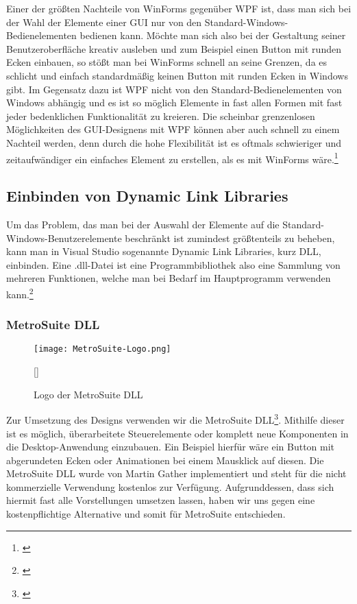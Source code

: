 Einer der größten Nachteile von WinForms gegenüber WPF ist, dass man sich bei der Wahl der Elemente einer GUI nur von den Standard-Windows-Bedienelementen bedienen kann. Möchte man sich also bei der Gestaltung seiner Benutzeroberfläche kreativ ausleben und zum Beispiel einen Button mit runden Ecken einbauen, so stößt man bei WinForms schnell an seine Grenzen, da es schlicht und einfach standardmäßig keinen Button mit runden Ecken in Windows gibt. Im Gegensatz dazu ist WPF nicht von den Standard-Bedienelementen von Windows abhängig und es ist so möglich Elemente in fast allen Formen mit fast jeder bedenklichen Funktionalität zu kreieren. Die scheinbar grenzenlosen Möglichkeiten des GUI-Designens mit WPF können aber auch schnell zu einem Nachteil werden, denn durch die hohe Flexibilität ist es oftmals schwieriger und zeitaufwändiger ein einfaches Element zu erstellen, als es mit WinForms wäre.\footnote[3]{\cite[Vgl.][]{Vergleich}}

\subsection{Einbinden von Dynamic Link Libraries}

 Um das Problem, das man bei der Auswahl der Elemente auf die Standard-Windows-Benutzerelemente beschränkt ist zumindest größtenteils zu beheben, kann man in Visual Studio sogenannte Dynamic Link Libraries, kurz DLL, einbinden. Eine .dll-Datei ist eine Programmbibliothek also eine Sammlung von mehreren Funktionen, welche man bei Bedarf im Hauptprogramm verwenden kann.\footnote[1]{\cite[Vgl.][]{DLL}}

\subsubsection{MetroSuite DLL}

\begin{figure}[H]
    \centering
    \texttt{[image: MetroSuite-Logo.png]}
    \caption[MetroSuiteDLL-Logo]{Logo der MetroSuite DLL}[\cite{MetroSuite1}]
\end{figure}
\noindent 
Zur Umsetzung des Designs verwenden wir die MetroSuite DLL\footnote[2]{\cite[Vgl.][]{MetroSuite2}}. Mithilfe dieser ist es möglich, überarbeitete Steuerelemente oder komplett neue Komponenten in die Desktop-Anwendung einzubauen. Ein Beispiel hierfür wäre ein Button mit abgerundeten Ecken oder Animationen bei einem Mausklick auf diesen. Die MetroSuite DLL wurde von Martin Gather implementiert und steht für die nicht kommerzielle Verwendung kostenlos zur Verfügung. Aufgrunddessen, dass sich hiermit fast alle Vorstellungen umsetzen lassen, haben wir uns gegen eine kostenpflichtige Alternative und somit für MetroSuite entschieden.


